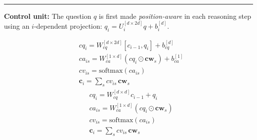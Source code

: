 \documentclass[paperwidth=36in,paperheight=48in,portrait,fontscale=0.36]{baposter}
\newcommand{\cw}{\mathbf{cw}}
\newcommand{\cc}{\mathbf{c}}
\begin{document}
\begin{poster}
{\\
\vspace{-5pt}
\hrule
\vspace{10pt}
\noindent\textbf{Control unit:} The question $q$ is first made \emph{position-aware} in each reasoning step using an $i$-dependent projection: $q_i = U_i^{[d \times 2d]} q + b_i^{[d]}$.


\begin{multicols}{2}
	\noindent
	\begin{align*}
		&cq_i = W_{cq}^{[d \times 2d]} [c_{i-1}, q_i] + b_{cq}^{[d]}  \tag{c1} \\
		&ca_{is} = W_{ca}^{[1 \times d]} (cq_i \odot \cw_s) + b_{ca}^{[1]}
		\tag{c2.1}\\
		&cv_{is} = \textrm{softmax}(ca_{is}) \tag{c2.2}\\
		&\cc_i = \sum_s cv_{is} \, \cw_s  \tag{c2.3}
	\end{align*}
	\columnbreak
	{\begin{align*}
		&cq_i = W_{cq}^{[d \times d]} c_{i-1} + q_i  \tag{c1} \\
		&ca_{is} = W_{ca}^{[1 \times d]} (cq_i \odot \cw_s)  \tag{c2.1}\\
		&cv_{is} = \textrm{softmax}(ca_{is}) \tag{c2.2}\\
		&\cc_i = \sum_s cv_{is} \, \cw_s  \tag{c2.3}
	\end{align*}}
\end{multicols}

\vskip -0.6cm

}
\end{poster}
\end{document}

